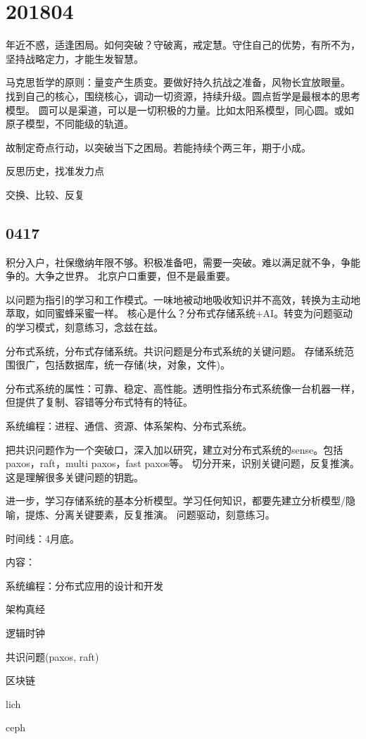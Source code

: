 \section{201804}

年近不惑，适逢困局。如何突破？守破离，戒定慧。守住自己的优势，有所不为，
坚持战略定力，才能生发智慧。

马克思哲学的原则：量变产生质变。要做好持久抗战之准备，风物长宜放眼量。
找到自己的核心，围绕核心，调动一切资源，持续升级。圆点哲学是最根本的思考模型。
圆可以是渠道，可以是一切积极的力量。比如太阳系模型，同心圆。或如原子模型，不同能级的轨道。

故制定奇点行动，以突破当下之困局。若能持续个两三年，期于小成。

\begin{compactenum}
\item 反思历史，找准发力点
\item 交换、比较、反复
\end{compactenum}

\subsection{0417}

积分入户，社保缴纳年限不够。积极准备吧，需要一突破。难以满足就不争，争能争的。大争之世界。
北京户口重要，但不是最重要。

以问题为指引的学习和工作模式。一味地被动地吸收知识并不高效，转换为主动地萃取，如同蜜蜂采蜜一样。
核心是什么？分布式存储系统+AI。转变为问题驱动的学习模式，刻意练习，念兹在兹。

分布式系统，分布式存储系统。共识问题是分布式系统的关键问题。
存储系统范围很广，包括数据库，统一存储(块，对象，文件)。

分布式系统的属性：可靠、稳定、高性能。透明性指分布式系统像一台机器一样，但提供了复制、容错等分布式特有的特征。

系统编程：进程、通信、资源、体系架构、分布式系统。

把共识问题作为一个突破口，深入加以研究，建立对分布式系统的sense。包括paxos，raft，multi paxos，fast paxos等。
切分开来，识别关键问题，反复推演。这是理解很多关键问题的钥匙。

进一步，学习存储系统的基本分析模型。学习任何知识，都要先建立分析模型/隐喻，提炼、分离关键要素，反复推演。
问题驱动，刻意练习。

时间线：4月底。
\begin{compactenum}
内容：
\item 系统编程：分布式应用的设计和开发
\item 架构真经
\item 逻辑时钟
\item 共识问题(paxos, raft)
\item 区块链
\item lich
\item ceph
\end{compactenum}
